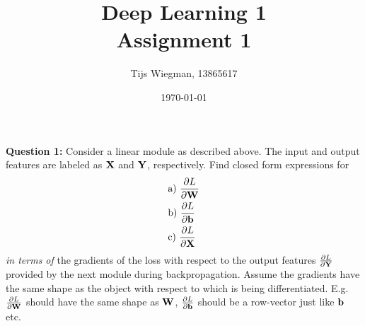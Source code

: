 \documentclass[a4paper]{article}
\title{Deep Learning 1 \\ \Large Assignment 1}
\author{Tijs Wiegman, 13865617}
\date{\today}
\renewcommand{\t}{\textrm}
\newcommand{\1}{\mathbbm{1}}
\newcommand{\<}{\langle}
\renewcommand{\>}{\rangle}
\newcommand{\pp}[2]{\frac{\partial #1}{\partial #2}}
\begin{document}
\maketitle

\textbf{Question 1:} Consider a linear module as described above. The input and output features are labeled as $\bold X$ and $\bold Y$, respectively. Find closed form expressions for
\begin{align*}
&\t{a)} \ \pp{L}{\bold W} \\
&\t{b)} \ \pp{L}{\bold b} \\
&\t{c)} \ \pp{L}{\bold X}
\end{align*}
\emph{in terms of} the gradients of the loss with respect to the output features $\pp{L}{\bold Y}$ provided by the next module during backpropagation. Assume the gradients have the same shape as the object with respect to which is being differentiated. E.g. $\pp{L}{\bold W}$ should have the same shape as $\bold W$, $\pp{L}{\bold b}$ should be a row-vector just like $\bold b$ etc.
\end{document}
